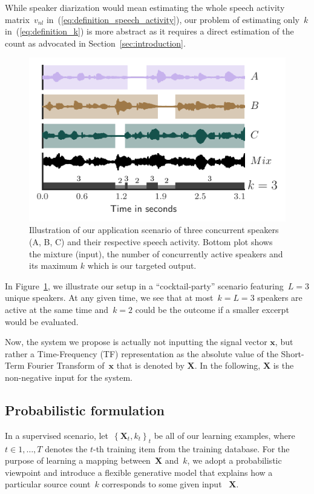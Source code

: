 While speaker diarization would mean estimating the whole speech activity matrix~$v_{nl}$ in~(\ref{eq:definition_speech_activity}), our problem of estimating only~$k$ in~(\ref{eq:definition_k}) is more abstract as it requires a direct estimation of the count as advocated in Section~\ref{sec:introduction}.
\begin{figure}[t]
  \centering
  \includegraphics[width=0.8\columnwidth]{Chapters/08_Analysis_CountNet/dsc/figures/teaser.pdf}
  \caption{Illustration of our application scenario of three concurrent speakers (A, B, C) and their respective speech activity. Bottom plot shows the mixture (input), the number of concurrently active speakers and its maximum \(k\) which is our targeted output.}%
  \label{fig:teaser}%
\end{figure}
In Figure~\ref{fig:teaser}, we illustrate our setup in a ``cocktail-party'' scenario featuring~$L=3$ unique speakers.
At any given time, we see that at most~$k=L=3$ speakers are active at the same time and~$k=2$ could be the outcome if a smaller excerpt would be evaluated.

Now, the system we propose is actually not inputting the signal vector $\mathbf{x}$, but rather a Time-Frequency (TF) representation as the absolute value of the Short-Term Fourier Transform of~$\mathbf{x}$ that is denoted by $\mathbf{X}$.
In the following, $\mathbf{X}$ is the non-negative input for the system.

\subsection{Probabilistic formulation}%
\label{ssec:model}
In a supervised scenario, let~$ \left\{\mathbf{X}_t,k_t\right\}_t$ be all of our learning examples, where~$t \in{1,\dots,T}$ denotes the $t$-th training item from the training database.
For the purpose of learning a mapping between~$\mathbf{X}$ and~$k$, we adopt a probabilistic viewpoint and introduce a flexible generative model that explains how a particular source count~$k$ corresponds to some given input ~$\mathbf{X}$.

